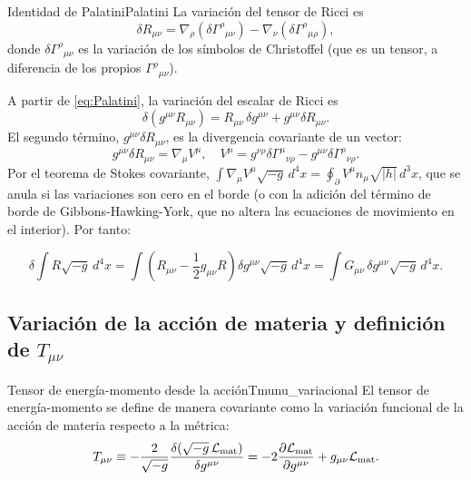 \begin{lema}{Identidad de Palatini}{Palatini}
La variación del tensor de Ricci es
\begin{equation}
  \delta R_{\mu\nu} = \nabla_\rho(\delta\Gamma^\rho{}_{\mu\nu}) - \nabla_\nu(\delta\Gamma^\rho{}_{\mu\rho}),
  \label{eq:Palatini}
\end{equation}
donde $\delta\Gamma^\rho{}_{\mu\nu}$ es la variación de los símbolos de Christoffel (que es un tensor, a diferencia de los propios $\Gamma^\rho{}_{\mu\nu}$).
\end{lema}

A partir de \eqref{eq:Palatini}, la variación del escalar de Ricci es
\begin{equation}
  \delta(g^{\mu\nu}R_{\mu\nu}) = R_{\mu\nu}\,\delta g^{\mu\nu} + g^{\mu\nu}\delta R_{\mu\nu}.
\end{equation}
El segundo término, $g^{\mu\nu}\delta R_{\mu\nu}$, es la divergencia covariante de un vector:
\begin{equation}
  g^{\mu\nu}\delta R_{\mu\nu} = \nabla_\mu V^\mu,
  \quad V^\mu = g^{\nu\rho}\delta\Gamma^\mu{}_{\nu\rho} - g^{\mu\nu}\delta\Gamma^\rho{}_{\nu\rho}.
\end{equation}
Por el teorema de Stokes covariante, $\int\nabla_\mu V^\mu\sqrt{-g}\,d^4x = \oint_\partial V^\mu n_\mu\sqrt{|h|}\,d^3x$, que se anula si las variaciones son cero en el borde (o con la adición del término de borde de Gibbons-Hawking-York, que no altera las ecuaciones de movimiento en el interior). Por tanto:

\begin{equation}
  \delta\int R\sqrt{-g}\,d^4x = \int\left(R_{\mu\nu} - \frac{1}{2}g_{\mu\nu}R\right)\delta g^{\mu\nu}\sqrt{-g}\,d^4x
  = \int G_{\mu\nu}\,\delta g^{\mu\nu}\sqrt{-g}\,d^4x.
  \label{eq:var_R}
\end{equation}

\subsection{Variación de la acción de materia y definición de $T_{\mu\nu}$}

\begin{definicion}{Tensor de energía-momento desde la acción}{Tmunu_variacional}
El tensor de energía-momento se define de manera covariante como la variación funcional de la acción de materia respecto a la métrica:
\begin{equation}
  T_{\mu\nu} \equiv -\frac{2}{\sqrt{-g}}\frac{\delta(\sqrt{-g}\,\mathcal{L}_{\rm mat})}{\delta g^{\mu\nu}}
             = -2\frac{\partial\mathcal{L}_{\rm mat}}{\partial g^{\mu\nu}} + g_{\mu\nu}\mathcal{L}_{\rm mat}.
  \label{eq:Tmunu_def_variacional}
\end{equation}
\end{definicion}

